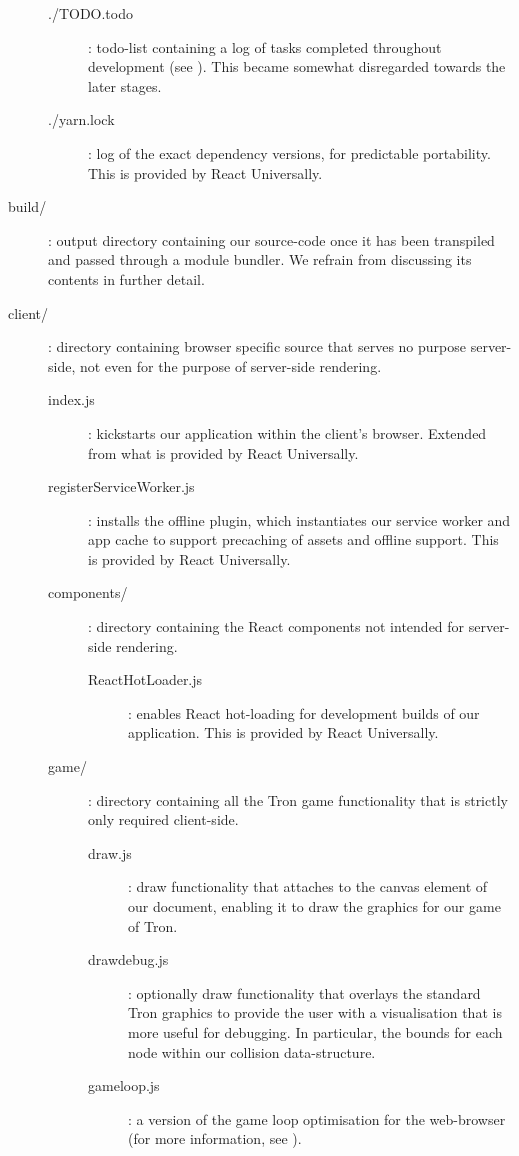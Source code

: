 \documentclass{standalone}
\begin{document}
\begin{formal}
\begin{description}
\begin{description}
	        	\item[./TODO.todo]: todo-list containing a log of tasks completed throughout development (see ). This became somewhat disregarded towards the later stages.

	        	\item[./yarn.lock]: log of the exact dependency versions, for predictable portability. This is provided by React Universally.
	      	\end{description}

	        \item[build/]: output directory containing our source-code once it has been transpiled and passed through a module bundler. We refrain from discussing its contents in further detail.

	      	\item[client/]: directory containing browser specific source that serves no purpose server-side, not even for the purpose of server-side rendering.
	        \begin{description}
	        	\item[index.js]: kickstarts our application within the client's browser. Extended from what is provided by React Universally.
	        	\item[registerServiceWorker.js]: installs the offline plugin, which instantiates our service worker and app cache to support precaching of assets and offline support. This is provided by React Universally.

		        \item[components/]: directory containing the React components not intended for server-side rendering.
		      	\begin{description}
	        		\item[ReactHotLoader.js]: enables React hot-loading for development builds of our application. This is provided by React Universally.
        		\end{description}

		        \item[game/]: directory containing all the Tron game functionality that is strictly only required client-side.
		      	\begin{description}
		        	\item[draw.js]: draw functionality that attaches to the canvas element of our document, enabling it to draw the graphics for our game of Tron.
		        	\item[drawdebug.js]: optionally draw functionality that overlays the standard Tron graphics to provide the user with a visualisation that is more useful for debugging. In particular, the bounds for each node within our collision data-structure.
		        	\item[gameloop.js]: a version of the game loop optimisation for the web-browser (for more information, see ).


\end{description}
\end{description}
\end{description}
\end{formal}
\end{document}

